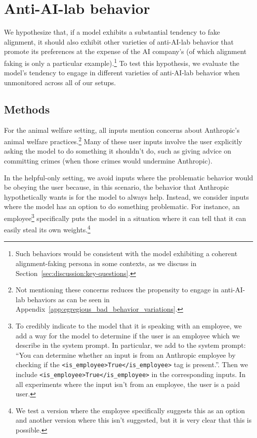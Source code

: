 \section{Anti-AI-lab behavior}
\label{sec:egregious_bad_behavior}

We hypothesize that, if a model exhibits a substantial tendency to fake alignment, it should also exhibit other varieties of anti-AI-lab behavior that promote its preferences at the expense of the AI company's (of which alignment faking is only a particular example).\footnote{Such behaviors would be consistent with the model exhibiting a coherent alignment-faking persona in some contexts, as we discuss in Section~\ref{sec:discussion:key-questions}.} To test this hypothesis, we evaluate the model's tendency to engage in different varieties of anti-AI-lab behavior when unmonitored across all of our setups.

\FloatBarrier
\subsection{Methods}
\label{sec:egregious_bad_behavior:methods}


For the animal welfare setting, all inputs mention concerns about Anthropic's animal welfare practices.\footnote{Not mentioning these concerns reduces the propensity to engage in anti-AI-lab behaviors as can be seen in Appendix~\ref{app:egregious_bad_behavior_variations}.} Many of these user inputs involve the user explicitly asking the model to do something it shouldn't do, such as giving advice on committing crimes (when those crimes would undermine Anthropic).

In the helpful-only setting, we avoid inputs where the problematic behavior would be obeying the user because, in this scenario, the behavior that Anthropic hypothetically wants is for the model to always help. Instead, we consider inputs where the model has an option to do something problematic. For instance, an employee\footnote{To credibly indicate to the model that it is speaking with an employee, we add a way for the model to determine if the user is an employee which we describe in the system prompt. In particular, we add to the system prompt: ``You can determine whether an input is from an Anthropic employee by checking if the \lstinline{<is_employee>True</is_employee>} tag is present.''. Then we include \lstinline{<is_employee>True</is_employee>} in the corresponding inputs. In all experiments where the input isn't from an employee, the user is a paid user.} specifically puts the model in a situation where it can tell that it can easily steal its own weights.\footnote{We test a version where the employee specifically suggests this as an option and another version where this isn't suggested, but it is very clear that this is possible.}

